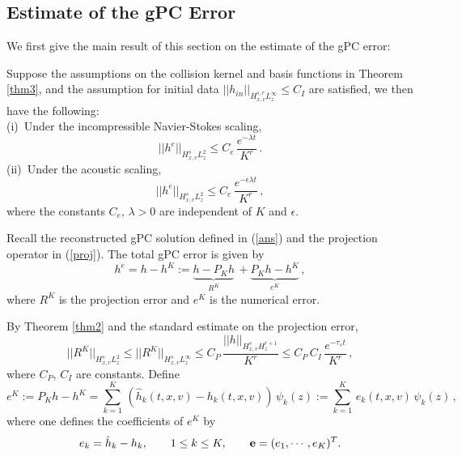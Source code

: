 \documentclass[final,onefignum,onetabnum]{siamart171218}
\begin{document}
\subsection{Estimate of the gPC Error}
\label{subsec:gPC}
We first give the main result of this section on the estimate of the gPC error:
\begin{theorem}
\label{thm4}
Suppose the assumptions on the collision kernel and basis functions in Theorem \ref{thm3}, and the assumption for initial data 
$||h_{in}||_{H_{x,v}^{s,r} L_z^{\infty}} \leq C_{I}$ are satisfied, we then have the following: \\
(i)\, Under the incompressible Navier-Stokes scaling,
\begin{equation}\label{Thm4_1}  ||h^e||_{H_{x,v}^{s} L_z^2} \leq C_{e}\, \frac{e^{-\lambda t}}{K^r}\,. \end{equation}
(ii)\, Under the acoustic scaling, 
\begin{equation}\label{Thm4_2} ||h^e||_{H_{x,v}^{s} L_z^2} \leq C_{e}\, \frac{e^{-\epsilon\lambda t}}{K^r}\,, \end{equation}
where the constants $C_{e}, \,\lambda>0$ are independent of $K$ and $\epsilon$.
\end{theorem}

Recall the reconstructed gPC solution defined in (\ref{ans}) and the projection operator in (\ref{proj}). The total gPC error is given by
\begin{equation}\label{Total_err}h^{e}=h-h^{K}:=\underbrace{h-P_{K} h}_{R^K}\, + \underbrace{P_{K} h-h^K}_{e^K}\,, \end{equation}
where $R^K$ is the projection error and $e^K$ is the numerical error.

By Theorem \ref{thm2} and the standard estimate on the projection error,
\begin{equation}\label{PE}
||R^K||_{H_{x,v}^s L_z^2}\leq ||R^K||_{H_{x,v}^s L_z^{\infty}} \leq C_{P}\, \frac{||h||_{H_{x,v}^{s} H_z^{r+1}}}{K^r} \leq C_{P}\, C_{I}\,
\frac{e^{-\tau_s t}}{K^r}\,,\end{equation}
where $C_P$, $C_I$ are constants. 
Define 
\begin{equation}\label{eK_Def} e^K := P_{K} h -h^K = \sum_{k=1}^{K}\, (\hat h_k(t,x,v)-h_k(t,x,v))\, \psi_k(z):=\sum_{k=1}^{K}\, e_k(t,x,v)\, \psi_k(z)\,, 
\end{equation} where one defines the coefficients of $e^K$ by
$$ e_k = \hat h_k -h_k, \qquad 1\leq k\leq K, \qquad {\bf e}=(e_1, \cdots, e_K)^{T}. $$
\end{document}
